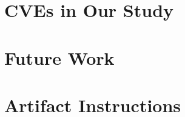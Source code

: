 \begin{appendices}
\section{CVEs in Our Study}
\label{cve-details}

\section{Future Work}

\section{Artifact Instructions}

\end{appendices}
